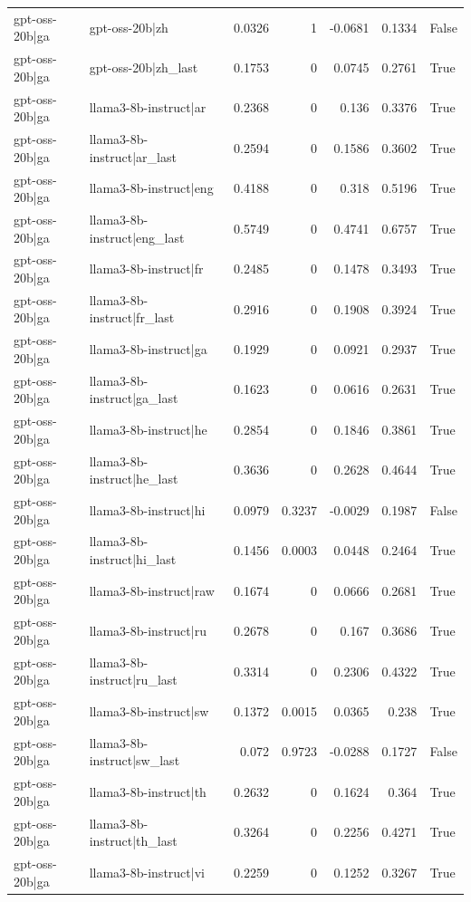 \begin{table}
\begin{tabular}{l l r r r r l}
gpt-oss-20b|ga & gpt-oss-20b|zh & 0.0326 & 1 & -0.0681 & 0.1334 & False \\
gpt-oss-20b|ga & gpt-oss-20b|zh_last & 0.1753 & 0 & 0.0745 & 0.2761 & True \\
gpt-oss-20b|ga & llama3-8b-instruct|ar & 0.2368 & 0 & 0.136 & 0.3376 & True \\
gpt-oss-20b|ga & llama3-8b-instruct|ar_last & 0.2594 & 0 & 0.1586 & 0.3602 & True \\
gpt-oss-20b|ga & llama3-8b-instruct|eng & 0.4188 & 0 & 0.318 & 0.5196 & True \\
gpt-oss-20b|ga & llama3-8b-instruct|eng_last & 0.5749 & 0 & 0.4741 & 0.6757 & True \\
gpt-oss-20b|ga & llama3-8b-instruct|fr & 0.2485 & 0 & 0.1478 & 0.3493 & True \\
gpt-oss-20b|ga & llama3-8b-instruct|fr_last & 0.2916 & 0 & 0.1908 & 0.3924 & True \\
gpt-oss-20b|ga & llama3-8b-instruct|ga & 0.1929 & 0 & 0.0921 & 0.2937 & True \\
gpt-oss-20b|ga & llama3-8b-instruct|ga_last & 0.1623 & 0 & 0.0616 & 0.2631 & True \\
gpt-oss-20b|ga & llama3-8b-instruct|he & 0.2854 & 0 & 0.1846 & 0.3861 & True \\
gpt-oss-20b|ga & llama3-8b-instruct|he_last & 0.3636 & 0 & 0.2628 & 0.4644 & True \\
gpt-oss-20b|ga & llama3-8b-instruct|hi & 0.0979 & 0.3237 & -0.0029 & 0.1987 & False \\
gpt-oss-20b|ga & llama3-8b-instruct|hi_last & 0.1456 & 0.0003 & 0.0448 & 0.2464 & True \\
gpt-oss-20b|ga & llama3-8b-instruct|raw & 0.1674 & 0 & 0.0666 & 0.2681 & True \\
gpt-oss-20b|ga & llama3-8b-instruct|ru & 0.2678 & 0 & 0.167 & 0.3686 & True \\
gpt-oss-20b|ga & llama3-8b-instruct|ru_last & 0.3314 & 0 & 0.2306 & 0.4322 & True \\
gpt-oss-20b|ga & llama3-8b-instruct|sw & 0.1372 & 0.0015 & 0.0365 & 0.238 & True \\
gpt-oss-20b|ga & llama3-8b-instruct|sw_last & 0.072 & 0.9723 & -0.0288 & 0.1727 & False \\
gpt-oss-20b|ga & llama3-8b-instruct|th & 0.2632 & 0 & 0.1624 & 0.364 & True \\
gpt-oss-20b|ga & llama3-8b-instruct|th_last & 0.3264 & 0 & 0.2256 & 0.4271 & True \\
gpt-oss-20b|ga & llama3-8b-instruct|vi & 0.2259 & 0 & 0.1252 & 0.3267 & True \\

\end{tabular}
\end{table}

